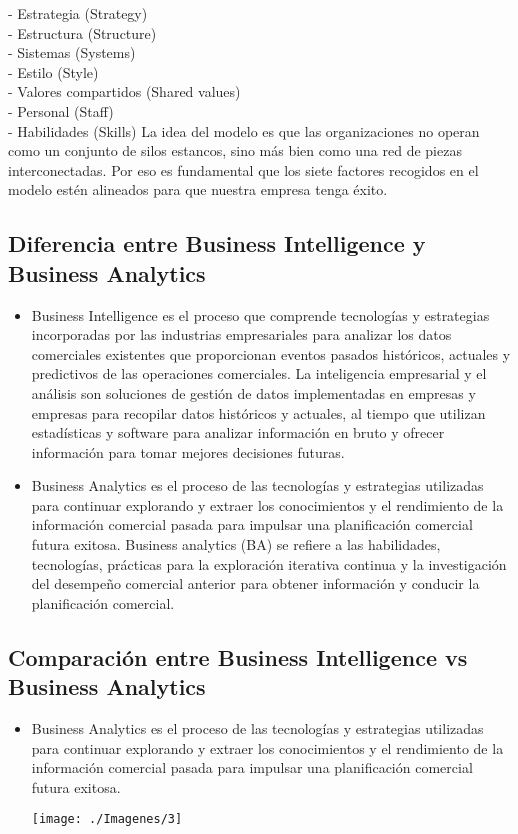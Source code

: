 \documentclass[%
 reprint,
 amsmath,amssymb,
 aps,
]{revtex4-1}
\begin{document}
\begin{itemize}
- Estrategia (Strategy)\\
- Estructura (Structure)\\
- Sistemas (Systems)\\
- Estilo (Style)\\
- Valores compartidos (Shared values)\\
- Personal (Staff)\\
- Habilidades (Skills)
La idea del modelo es que las organizaciones no operan como un conjunto de silos estancos, sino más bien como una red de piezas interconectadas. Por eso es fundamental que los siete factores recogidos en el modelo estén alineados para que nuestra empresa tenga éxito.
	\end{itemize} 

\subsection{Diferencia entre Business Intelligence y Business Analytics}
	     \begin{itemize}
		\item Business Intelligence es el proceso que comprende tecnologías y estrategias incorporadas por las industrias empresariales para analizar los datos comerciales existentes que proporcionan eventos pasados históricos, actuales y predictivos de las operaciones comerciales.
La inteligencia empresarial y el análisis son soluciones de gestión de datos implementadas en empresas y empresas para recopilar datos históricos y actuales, al tiempo que utilizan estadísticas y software para analizar información en bruto y ofrecer información para tomar mejores decisiones futuras.

		\item Business Analytics es el proceso de las tecnologías y estrategias utilizadas para continuar explorando y extraer los conocimientos y el rendimiento de la información comercial pasada para impulsar una planificación comercial futura exitosa.
Business analytics (BA) se refiere a las habilidades, tecnologías, prácticas para la exploración iterativa continua y la investigación del desempeño comercial anterior para obtener información y conducir la planificación comercial.
\cite{Educba}
	           \end{itemize}
\subsection{Comparación entre Business Intelligence vs Business Analytics}
  \begin{itemize}
		\item Business Analytics es el proceso de las tecnologías y estrategias utilizadas para continuar explorando y extraer los conocimientos y el rendimiento de la información comercial pasada para impulsar una planificación comercial futura exitosa.\cite{Educba}
\begin{center}
		\texttt{[image: ./Imagenes/3]}
		\end{center}
	           \end{itemize}
\end{document}
